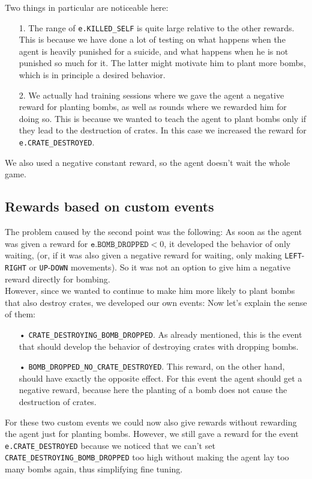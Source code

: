 Two things in particular are noticeable here: 
\begin{itemize}
\item[1.] The range of \texttt{e.KILLED\_SELF} is quite large relative to the other rewards. This is because we have done a lot of testing on what happens when the agent is heavily punished for a suicide, and what happens when he is not punished so much for it. The latter might motivate him to plant more bombs, which is in principle a desired behavior.
\item[2.] We actually had training sessions where we gave the agent a negative reward for planting bombs, as well as rounds where we rewarded him for doing so. This is because we wanted to teach the agent to plant bombs only if they lead to the destruction of crates. In this case we increased the reward for \texttt{e.CRATE\_DESTROYED}.
\end{itemize}
We also used a negative constant reward, so the agent doesn't wait the whole game.

\subsection{Rewards based on custom events}
The problem caused by the second point was the following: As soon as the agent was given a reward for $\texttt{e.BOMB\_DROPPED} < 0$, it developed the behavior of only waiting, (or, if it was also given a negative reward for waiting, only making \texttt{LEFT}-\texttt{RIGHT} or \texttt{UP}-\texttt{DOWN} movements). So it was not an option to give him a negative reward directly for bombing.
\\

However, since we wanted to continue to make him more likely to plant bombs that also destroy crates, we developed our own events:
\vspace{0.1cm}
% 
\vspace{0.1cm}
Now let's explain the sense of them:
\begin{itemize}
\item[•] \texttt{CRATE\_DESTROYING\_BOMB\_DROPPED}. As already mentioned, this is the event that should develop the behavior of destroying crates with dropping bombs. 
\item[•] \texttt{BOMB\_DROPPED\_NO\_CRATE\_DESTROYED}. This reward, on the other hand, should have exactly the opposite effect. For this event the agent should get a negative reward, because here the planting of a bomb does not cause the destruction of crates.
\end{itemize}
For these two custom events we could now also give rewards without rewarding the agent just for planting bombs. However, we still gave a reward for the event \texttt{e.CRATE\_DESTROYED} because we noticed that we can't set \texttt{CRATE\_DESTROYING\_BOMB\_DROPPED} too high without making the agent lay too many bombs again, thus simplifying fine tuning.
\\

